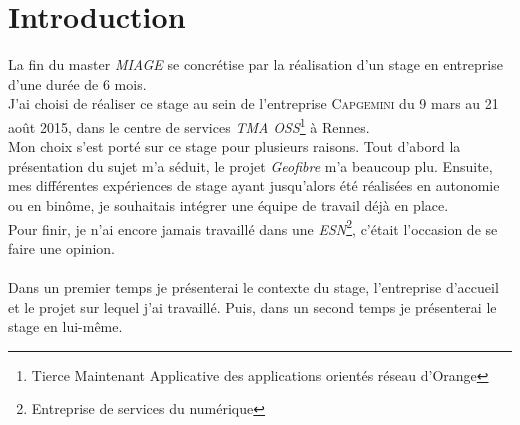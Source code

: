 \chapter*{Introduction}
La fin du master \textit{MIAGE} se concrétise par la réalisation d’un stage en entreprise d’une durée de 6 mois.
\\J’ai choisi de réaliser ce stage au sein de l’entreprise \textsc{Capgemini} du 9 mars au 21 août 2015,
dans le centre de services \textit{TMA OSS}\footnote{Tierce Maintenant Applicative des applications orientés réseau d'Orange} à Rennes.
\\Mon choix s’est porté sur ce stage pour plusieurs raisons.
 Tout d’abord la présentation du sujet m'a séduit, le projet \textit{Geofibre} m'a beaucoup plu.
 Ensuite, mes différentes expériences de stage ayant jusqu’alors été réalisées en
autonomie ou en binôme, je souhaitais intégrer une équipe de travail déjà en place.
\\Pour finir, je n'ai encore jamais travaillé dans une \textit{ESN}\footnote{Entreprise de services du numérique}, c'était l'occasion de se
faire une opinion.
\\\\
Dans un premier temps je présenterai le contexte du stage, l'entreprise d'accueil et le projet sur lequel j'ai travaillé.
Puis, dans un second temps je présenterai le stage en lui-même.
